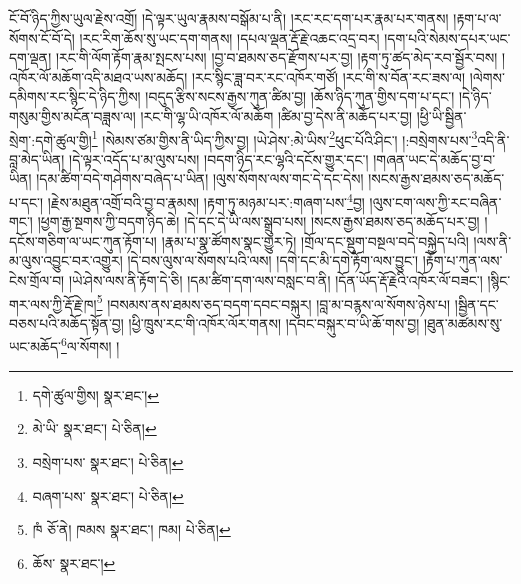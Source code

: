 ངོ་བོ་ཉིད་ཀྱིས་ཡུལ་རྗེས་འགྲོ། །དེ་ལྟར་ཡུལ་རྣམས་བསྒོམ་པ་ནི། །རང་རང་དག་པར་རྣམ་པར་གནས། །རྟག་པ་ལ་སོགས་ངོ་བོ་དེ། །རང་རིག་ཆོས་སུ་ཡང་དག་གནས། །དཔལ་ལྡན་རྡོ་རྗེ་འཆང་འདྲ་བར། །དག་པའི་སེམས་དཔར་ཡང་དག་ལྡན། །རང་གི་ལོག་རྟོག་རྣམ་སྤངས་པས། །བྱ་བ་ཐམས་ཅད་རྫོགས་པར་བྱ། །རྟག་ཏུ་ཚད་མེད་རབ་སྦྱོར་བས། །འཁོར་ལོ་མཆོག་འདི་མཐའ་ཡས་མཆོད། །རང་སྙིང་ཟླ་བར་རང་འཁོར་གཙོ། །རང་གི་ས་བོན་རང་ཟས་ལ། །ལེགས་དམིགས་རང་སྙིང་དེ་ཉིད་ཀྱིས། །བདུད་རྩིས་སངས་རྒྱས་ཀུན་ཚིམ་བྱ། །ཆོས་ཉིད་ཀུན་གྱིས་དག་པ་དང་། །དེ་ཉིད་གསུམ་གྱིས་མངོན་བཟླས་ལ། །རང་གི་ལྷ་ཡི་འཁོར་ལོ་མཆོག །ཚིམ་བྱ་དེས་ནི་མཆོད་པར་བྱ། །ཕྱི་ཡི་སྦྱིན་སྲེག་:དགེ་ཚུལ་གྱི།\footnote{དགེ་ཚུལ་གྱིས།  སྣར་ཐང་། } །སེམས་ཙམ་གྱིས་ནི་ཡིད་ཀྱིས་བྱ། །ཡེ་ཤེས་:མེ་ཡིས་\footnote{མེ་ཡི་  སྣར་ཐང་།  པེ་ཅིན། }ཕུང་པོའི་ཤིང་། །:བསྲེགས་པས་\footnote{བསྲེག་པས་  སྣར་ཐང་།  པེ་ཅིན། }འདི་ནི་བླ་མེད་ཡིན། །དེ་ལྟར་འདོད་པ་མ་ལུས་པས། །བདག་ཉིད་རང་ལྷའི་དངོས་གྱུར་དང་། །གཞན་ཡང་དེ་མཆོད་བྱ་བ་ཡིན། །དམ་ཚིག་བདེ་གཤེགས་བཞེད་པ་ཡིན། །ལུས་སོགས་ལས་གང་དེ་དང་དེས། །སངས་རྒྱས་ཐམས་ཅད་མཆོད་པ་དང་། །རྗེས་མཐུན་འགྲོ་བའི་བྱ་བ་རྣམས། །རྟག་ཏུ་མཉམ་པར་:གཞག་པས་\footnote{བཞག་པས་  སྣར་ཐང་།  པེ་ཅིན། }བྱ། །ལུས་ངག་ལས་ཀྱི་རང་བཞིན་གང་། །ཕྱག་རྒྱ་སྔགས་ཀྱི་བདག་ཉིད་ཆེ། །དེ་དང་དེ་ཡི་ལས་སྒྲུབ་པས། །སངས་རྒྱས་ཐམས་ཅད་མཆོད་པར་བྱ། །དངོས་གཅིག་ལ་ཡང་ཀུན་རྟོག་པ། །རྣམ་པ་སྣ་ཚོགས་སྣང་གྱུར་ཏེ། །གྲོལ་དང་སྡུག་བསྔལ་བདེ་བསྐྱེད་པའི། །ལས་ནི་མ་ལུས་འབྱུང་བར་འགྱུར། །དེ་བས་ལུས་ལ་སོགས་པའི་ལས། །དགེ་དང་མི་དགེ་རྟོག་ལས་བྱུང་། །རྟོག་པ་ཀུན་ལས་ངེས་གྲོལ་བ། །ཡེ་ཤེས་ལས་ནི་རྟོག་དེ་ཅི། །དམ་ཚིག་དག་ལས་བསླང་བ་ནི། །དོན་ཡོད་རྡོ་རྗེའི་འཁོར་ལོ་བཟང་། །སྙིང་གར་ལས་ཀྱི་རྡོ་རྗེ་ཁ།\footnote{ཁཾ  ཅོ་ནེ། ཁམས  སྣར་ཐང་། ཁམ།  པེ་ཅིན། } །བསམས་ནས་ཐམས་ཅད་བདག་དབང་བསྐུར། །བླ་མ་བརྙས་ལ་སོགས་ཉེས་པ། །སྦྱིན་དང་བཅས་པའི་མཆོད་སྟོན་བྱ། །ཕྱི་ཁྲུས་རང་གི་འཁོར་ལོར་གནས། །དབང་བསྐུར་བ་ཡི་ཆོ་གས་བྱ། །ཐུན་མཚམས་སུ་ཡང་མཆོད་\footnote{ཆོས་  སྣར་ཐང་། }ལ་སོགས། །
